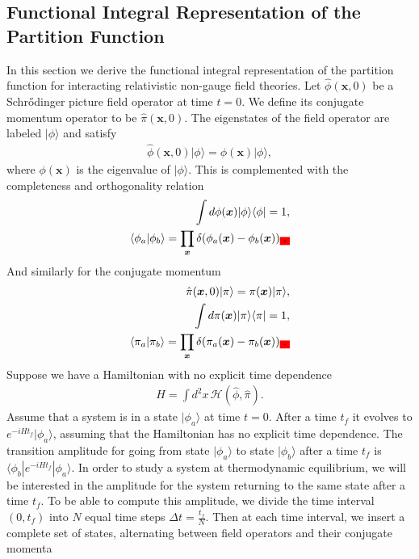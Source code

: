         \subsection{Functional Integral Representation of the Partition Function}
        In this section we derive the functional integral representation of the partition function for interacting relativistic non-gauge field theories.
        Let $\hat{\phi}(\bm{x},0)$ be a Schr{\H o}dinger picture field operator at time $t=0$. We define its conjugate momentum operator to be $\hat{\pi}(\bm{x},0)$. The eigenstates of the field operator are labeled $| \phi \rangle$ and satisfy
        \begin{align}
            \hat{\phi}(\bm{x},0) | \phi \rangle = \phi(\bm{x}) | \phi \rangle,
        \end{align}
        where $\phi(\bm{x})$ is the eigenvalue of $| \phi \rangle$. This is complemented with the completeness and orthogonality relation
        \begin{align}
            \int d \phi(\bm{x}) | \phi \rangle \langle \phi | = 1, \\
            \langle \phi_a | \phi_b \rangle = \prod_{\bm{x}} \delta(\phi_a(\bm{x}) - \phi_b(\bm{x}))\colorbox{red}{.}
        \end{align}
        And similarly for the conjugate momentum
        \begin{align}
            \hat{\pi}(\bm{x},0) | \pi \rangle = \pi(\bm{x}) | \pi \rangle, \\
            \int d \pi(\bm{x}) | \pi \rangle \langle \pi | = 1, \\
            \langle \pi_a | \pi_b \rangle = \prod_{\bm{x}} \delta(\pi_a(\bm{x}) - \pi_b(\bm{x}))\colorbox{red}{.}
        \end{align}
        Suppose we have a Hamiltonian with no explicit time dependence
        \begin{align}
            H = \int d^2x \, \mathcal{H}(\hat{\phi}, \hat{\pi}).
        \end{align}
        Assume that a system is in a state $| \phi_a \rangle$ at time $t=0$. After a time $t_f$ it evolves to $e^{-i H t_f} | \phi_a \rangle$, assuming that the Hamiltonian has no explicit time dependence. The transition amplitude for going from state $| \phi_a \rangle$ to state $| \phi_b \rangle$ after a time $t_f$ is $\langle \phi_b | e^{-i H t_f} | \phi_a \rangle$. In order to study a system at thermodynamic equilibrium, we will be interested in the amplitude for the system returning to the same state after a time $t_f$. To be able to compute this amplitude, we divide the time interval $(0, t_f)$ into $N$ equal time steps $\Delta t = \frac{t_f}{N}$. Then at each time interval, we insert a complete set of states, alternating between field operators and their conjugate momenta


